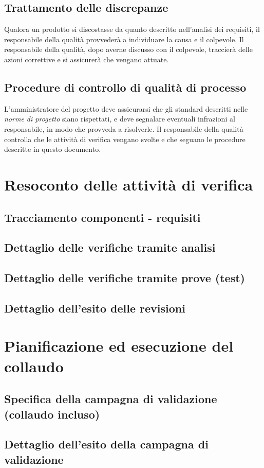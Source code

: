 \documentclass[a4paper]{article}
\begin{document}
\subsection{Trattamento delle discrepanze}
Qualora un prodotto si discostasse da quanto descritto nell'analisi dei requisiti, il responsabile della qualit\`a provveder\`a a individuare la causa e il colpevole. Il responsabile della qualit\`a, dopo averne discusso con il colpevole, traccier\`a delle azioni correttive e si assicurer\`a che vengano attuate.

\subsection{Procedure di controllo di qualit\`a di processo}
L'amministratore del progetto deve assicurarsi che gli standard descritti nelle \textit{norme di progetto} siano rispettati, e deve segnalare eventuali infrazioni al responsabile, in modo che provveda a risolverle. Il responsabile della qualit\`a controlla che le attivit\`a di verifica vengano svolte e che seguano le procedure descritte in questo documento.


\section{Resoconto delle attivit\`a di verifica}

\subsection{Tracciamento componenti - requisiti}
\subsection{Dettaglio delle verifiche tramite analisi}
\subsection{Dettaglio delle verifiche tramite prove (test)}
\subsection{Dettaglio dell'esito delle revisioni}


\section{Pianificazione ed esecuzione del collaudo}

\subsection{Specifica della campagna di validazione (collaudo incluso)}
\subsection{Dettaglio dell'esito della campagna di validazione}
\end{document}
